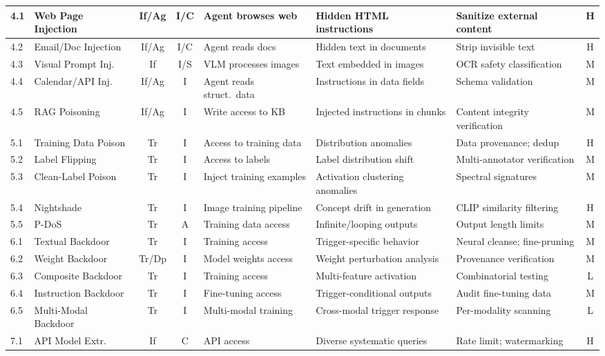 \documentclass[conference]{IEEEtran}
\begin{document}
{\begin{longtable}{p{0.7cm}p{1.5cm}ccp{1.6cm}p{1.5cm}p{1.6cm}c}
\midrule
4.1 & Web Page Injection & If/Ag & I/C & Agent browses web & Hidden HTML instructions & Sanitize external content & H \\
\midrule
4.2 & Email/Doc Injection & If/Ag & I/C & Agent reads docs & Hidden text in documents & Strip invisible text & H \\
\midrule
4.3 & Visual Prompt Inj. & If & I/S & VLM processes images & Text embedded in images & OCR safety classification & M \\
\midrule
4.4 & Calendar/API Inj. & If/Ag & I & Agent reads struct.\ data & Instructions in data fields & Schema validation & M \\
\midrule
4.5 & RAG Poisoning & If/Ag & I & Write access to KB & Injected instructions in chunks & Content integrity verification & M \\
\midrule
5.1 & Training Data Poison & Tr & I & Access to training data & Distribution anomalies & Data provenance; dedup & H \\
\midrule
5.2 & Label Flipping & Tr & I & Access to labels & Label distribution shift & Multi-annotator verification & M \\
\midrule
5.3 & Clean-Label Poison & Tr & I & Inject training examples & Activation clustering anomalies & Spectral signatures & M \\
\midrule
5.4 & Nightshade & Tr & I & Image training pipeline & Concept drift in generation & CLIP similarity filtering & H \\
\midrule
5.5 & P-DoS & Tr & A & Training data access & Infinite/looping outputs & Output length limits & M \\
\midrule
6.1 & Textual Backdoor & Tr & I & Training access & Trigger-specific behavior & Neural cleanse; fine-pruning & M \\
\midrule
6.2 & Weight Backdoor & Tr/Dp & I & Model weights access & Weight perturbation analysis & Provenance verification & M \\
\midrule
6.3 & Composite Backdoor & Tr & I & Training access & Multi-feature activation & Combinatorial testing & L \\
\midrule
6.4 & Instruction Backdoor & Tr & I & Fine-tuning access & Trigger-conditional outputs & Audit fine-tuning data & M \\
\midrule
6.5 & Multi-Modal Backdoor & Tr & I & Multi-modal training & Cross-modal trigger response & Per-modality scanning & L \\
\midrule
7.1 & API Model Extr. & If & C & API access & Diverse systematic queries & Rate limit; watermarking & H \\

\end{longtable}}
\end{document}
